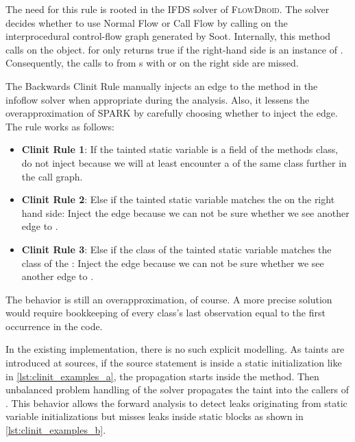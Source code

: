 \documentclass[../draft.tex]{subfiles}
\begin{document}
    The need for this rule is rooted in the IFDS solver of \textsc{FlowDroid}.
    The solver decides whether to use Normal Flow or Call Flow by calling  on the interprocedural control-flow graph generated by Soot.
    Internally, this method calls  on the  object.  for  only returns true if the right-hand side is an instance of .
    Consequently, the calls to  from s with  or  on the right side are missed.

    The Backwards Clinit Rule manually injects an edge to the  method in the infoflow solver when appropriate during the analysis.
    Also, it lessens the overapproximation of SPARK by carefully choosing whether to inject the edge. The rule works as follows:
    \begin{itemize}
        \item \textbf{Clinit Rule 1}: If the tainted static variable is a field of the methods class, do not inject because we will at least encounter a  of the same class further in the call graph.
        \item \textbf{Clinit Rule 2}: Else if the tainted static variable matches the  on the right hand side: Inject the edge because we can not be sure whether we see another edge to .
        \item \textbf{Clinit Rule 3}: Else if the class of the tainted static variable matches the class of the : Inject the edge because we can not be sure whether we see another edge to .
    \end{itemize}
    The behavior is still an overapproximation, of course.
    A more precise solution would require bookkeeping of every class's last observation equal to the first occurrence in the code.

    In the existing implementation, there is no such explicit modelling.
    As taints are introduced at sources, if the source statement is inside a static initialization like in \autoref{lst:clinit_examples_a}, the propagation starts inside the  method.
    Then unbalanced problem handling of the solver propagates the taint into the callers of .
    This behavior allows the forward analysis to detect leaks originating from static variable initializations but misses leaks inside static blocks as shown in \autoref{lst:clinit_examples_b}.
\end{document}
